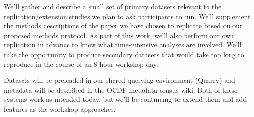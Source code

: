 We'll gather and describe a small set of primary datasets relevant to the replication/extension studies we plan to ask participants to run.  We'll supplement the methods descriptions of the paper we have chosen to replicate based on our proposed methods protocol.  As part of this work, we'll also perform our own replication in advance to know what time-intensive analyses are involved.  We'll take the opportunity to produce secondary datasets that would take too long to reproduce in the course of an 8 hour workshop day.

Datasets will be preloaded in our shared querying environment (Quarry) and metadata will be described in the OCDF metadata census wiki.  Both of these systems work as intended today, but we'll be continuing to extend them and add features as the workshop approaches.
